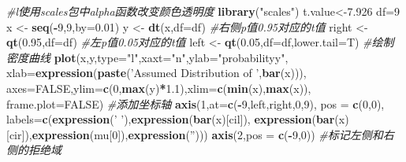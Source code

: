 \documentclass[
]{article}
\newenvironment{Shaded}{\begin{snugshade}}{\end{snugshade}}
\newcommand{\CommentTok}[1]{\textcolor[rgb]{0.56,0.35,0.01}{\textit{#1}}}
\newcommand{\DataTypeTok}[1]{\textcolor[rgb]{0.13,0.29,0.53}{#1}}
\newcommand{\DecValTok}[1]{\textcolor[rgb]{0.00,0.00,0.81}{#1}}
\newcommand{\FloatTok}[1]{\textcolor[rgb]{0.00,0.00,0.81}{#1}}
\newcommand{\KeywordTok}[1]{\textcolor[rgb]{0.13,0.29,0.53}{\textbf{#1}}}
\newcommand{\NormalTok}[1]{#1}
\newcommand{\OperatorTok}[1]{\textcolor[rgb]{0.81,0.36,0.00}{\textbf{#1}}}
\newcommand{\OtherTok}[1]{\textcolor[rgb]{0.56,0.35,0.01}{#1}}
\newcommand{\StringTok}[1]{\textcolor[rgb]{0.31,0.60,0.02}{#1}}
\begin{document}
\begin{Shaded}
\begin{Highlighting}[]
\CommentTok{#l使用scales包中alpha函数改变颜色透明度}
\KeywordTok{library}\NormalTok{(}\StringTok{"scales"}\NormalTok{)}
\NormalTok{t.value<-}\FloatTok{7.926}
\NormalTok{df=}\DecValTok{9}
\NormalTok{x <-}\StringTok{ }\KeywordTok{seq}\NormalTok{(}\OperatorTok{-}\DecValTok{9}\NormalTok{,}\DecValTok{9}\NormalTok{,}\DataTypeTok{by=}\FloatTok{0.01}\NormalTok{)}
\NormalTok{y <-}\StringTok{ }\KeywordTok{dt}\NormalTok{(x,}\DataTypeTok{df=}\NormalTok{df)}
\CommentTok{#右侧p值0.95对应的t值}
\NormalTok{right <-}\StringTok{ }\KeywordTok{qt}\NormalTok{(}\FloatTok{0.95}\NormalTok{,}\DataTypeTok{df=}\NormalTok{df)}
\CommentTok{#左p值0.05对应的t值}
\NormalTok{left <-}\StringTok{ }\KeywordTok{qt}\NormalTok{(}\FloatTok{0.05}\NormalTok{,}\DataTypeTok{df=}\NormalTok{df,}\DataTypeTok{lower.tail=}\NormalTok{T)}
\CommentTok{#绘制密度曲线}
\KeywordTok{plot}\NormalTok{(x,y,}\DataTypeTok{type=}\StringTok{"l"}\NormalTok{,}\DataTypeTok{xaxt=}\StringTok{"n"}\NormalTok{,}\DataTypeTok{ylab=}\StringTok{"probabilityy"}\NormalTok{,}
     \DataTypeTok{xlab=}\KeywordTok{expression}\NormalTok{(}\KeywordTok{paste}\NormalTok{(}\StringTok{'Assumed Distribution of '}\NormalTok{,}\KeywordTok{bar}\NormalTok{(x))),}
     \DataTypeTok{axes=}\OtherTok{FALSE}\NormalTok{,}\DataTypeTok{ylim=}\KeywordTok{c}\NormalTok{(}\DecValTok{0}\NormalTok{,}\KeywordTok{max}\NormalTok{(y)}\OperatorTok{*}\FloatTok{1.1}\NormalTok{),}\DataTypeTok{xlim=}\KeywordTok{c}\NormalTok{(}\KeywordTok{min}\NormalTok{(x),}\KeywordTok{max}\NormalTok{(x)),}
     \DataTypeTok{frame.plot=}\OtherTok{FALSE}\NormalTok{)}
\CommentTok{#添加坐标轴}
\KeywordTok{axis}\NormalTok{(}\DecValTok{1}\NormalTok{,}\DataTypeTok{at=}\KeywordTok{c}\NormalTok{(}\OperatorTok{-}\DecValTok{9}\NormalTok{,left,right,}\DecValTok{0}\NormalTok{,}\DecValTok{9}\NormalTok{),}
     \DataTypeTok{pos =} \KeywordTok{c}\NormalTok{(}\DecValTok{0}\NormalTok{,}\DecValTok{0}\NormalTok{),}
     \DataTypeTok{labels=}\KeywordTok{c}\NormalTok{(}\KeywordTok{expression}\NormalTok{(}\StringTok{' '}\NormalTok{),}\KeywordTok{expression}\NormalTok{(}\KeywordTok{bar}\NormalTok{(x)[cil]),}
     \KeywordTok{expression}\NormalTok{(}\KeywordTok{bar}\NormalTok{(x)[cir]),}\KeywordTok{expression}\NormalTok{(mu[}\DecValTok{0}\NormalTok{]),}\KeywordTok{expression}\NormalTok{(}\StringTok{''}\NormalTok{)))}
\KeywordTok{axis}\NormalTok{(}\DecValTok{2}\NormalTok{,}\DataTypeTok{pos =} \KeywordTok{c}\NormalTok{(}\OperatorTok{-}\DecValTok{9}\NormalTok{,}\DecValTok{0}\NormalTok{))}
\CommentTok{#标记左侧和右侧的拒绝域}

\end{Highlighting}
\end{Shaded}
\end{document}
